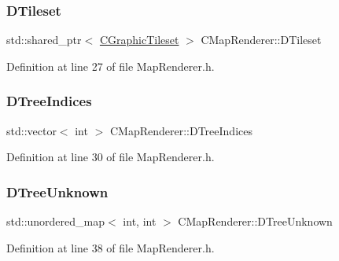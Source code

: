 \subsubsection{\texorpdfstring{D\+Tileset}{DTileset}}
{\footnotesize\ttfamily std\+::shared\+\_\+ptr$<$ \hyperlink{classCGraphicTileset}{C\+Graphic\+Tileset} $>$ C\+Map\+Renderer\+::\+D\+Tileset\hspace{0.3cm}{\ttfamily [protected]}}



Definition at line 27 of file Map\+Renderer.\+h.

\hypertarget{classCMapRenderer_a56708493a1499c671f4378204a0bfcb2}{}\label{classCMapRenderer_a56708493a1499c671f4378204a0bfcb2} 
\subsubsection{\texorpdfstring{D\+Tree\+Indices}{DTreeIndices}}
{\footnotesize\ttfamily std\+::vector$<$ int $>$ C\+Map\+Renderer\+::\+D\+Tree\+Indices\hspace{0.3cm}{\ttfamily [protected]}}



Definition at line 30 of file Map\+Renderer.\+h.

\hypertarget{classCMapRenderer_a55024ab05d176fcc6b60031aef47e1c8}{}\label{classCMapRenderer_a55024ab05d176fcc6b60031aef47e1c8} 
\subsubsection{\texorpdfstring{D\+Tree\+Unknown}{DTreeUnknown}}
{\footnotesize\ttfamily std\+::unordered\+\_\+map$<$ int, int $>$ C\+Map\+Renderer\+::\+D\+Tree\+Unknown\hspace{0.3cm}{\ttfamily [protected]}}



Definition at line 38 of file Map\+Renderer.\+h.

\hypertarget{classCMapRenderer_a032989788e978e11147ab8603d875771}{}\label{classCMapRenderer_a032989788e978e11147ab8603d875771} 
